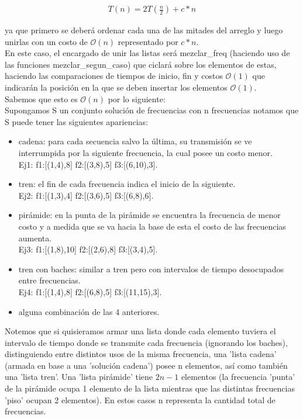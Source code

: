 \begin{equation*}
\begin{array}{l}
T(n) = 2T(\frac{n}{2}) + c*n
\end{array}
\end{equation*}

ya que primero se deberá ordenar cada una de las mitades del arreglo y luego unirlas con un costo de $\mathcal{O}(n)$ representado por $c*n$.\\
En este caso, el encargado de unir las listas será mezclar_freq (haciendo uso de las funciones mezclar_segun_caso) que ciclará sobre los elementos de estas, haciendo las comparaciones de tiempos de inicio, fin y costos $\mathcal{O}(1)$ que indicarán la posición en la que se deben insertar los elementos $\mathcal{O}(1)$. \\
Sabemos que esto es $\mathcal{O}(n)$ por lo siguiente:\\
Supongamos S un conjunto solución de frecuencias con n frecuencias notamos que S puede tener las siguientes apariencias:
\begin{itemize}
\item cadena: para cada secuencia salvo la última, su transmisión se ve interrumpida por la siguiente frecuencia, la cual posee un costo menor.\\ 
Ej1: f1:[(1,4),8] f2:[(3,8),5] f3:[(6,10),3].
\item tren: el fin de cada frecuencia indica el inicio de la siguiente.\\
 Ej2: f1:[(1,3),4] f2:[(3,6),5] f3:[(6,8),6].
\item pirámide: en la punta de la pirámide se encuentra la frecuencia de menor costo y a medida que se va hacia la base de esta el costo de las frecuencias aumenta.\\
 Ej3: f1:[(1,8),10] f2:[(2,6),8] f3:[(3,4),5].
\item tren con baches: similar a tren pero con intervalos de tiempo desocupados entre frecuencias.\\
Ej4: f1:[(1,4),8] f2:[(6,8),5] f3:[(11,15),3].
\item alguna combinación de las 4 anteriores.
\end{itemize}
Notemos que si quisieramos armar una lista donde cada elemento tuviera el intervalo de tiempo donde se transmite cada frecuencia (ignorando los baches), distinguiendo entre distintos usos de la misma frecuencia, una 'lista cadena' (armada en base a una 'solución cadena') posee n elementos, así como también una 'lista tren'. Una 'lista pirámide' tiene $2n-1$ elementos (la frecuencia 'punta' de la pirámide ocupa 1 elemento de la lista mientras que las distintas frecuencias 'piso' ocupan 2 elementos). En estos casos n representa la cantidad total de frecuencias.\\
